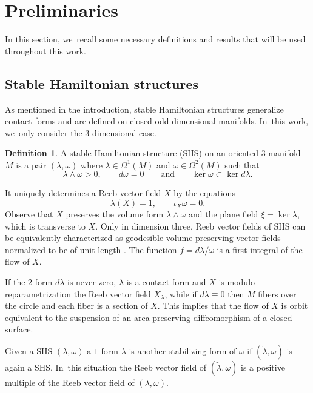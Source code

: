 \documentclass[JEP,XML,SOM,Unicode,NoEqCountersInSection,NoFloatCountersInSection,published]{cedram}
\newcommand{\threemanifold}{$3$\nobreakdash-mani\-fold\xspace}
\theoremstyle{definition}
\newtheorem{defi}[theorem]{Definition}
\begin{document}
\section{Preliminaries}\label{sec:prelim}

In this section, we~recall some necessary definitions and results that will be used throughout this work.

\subsection{Stable Hamiltonian structures}\label{ss:SHS}

As mentioned in the introduction, stable Hamiltonian structures generalize contact forms and are defined on closed odd-dimensional manifolds. In~this work, we~only consider the 3-dimensional case.

\begin{defi}
A stable Hamiltonian structure (SHS) on an oriented \threemanifold~$M$ is a pair $(\lambda,\omega)$ where $\lambda \in \Omega^1(M)$ and $\omega \in \Omega^2(M)$ such that
\[
\lambda\wedge \omega>0, \qquad d\omega=0 \qquad \mbox{and} \qquad \ker \omega \subset \ker d\lambda.
\]
\end{defi}

It uniquely determines a Reeb vector field $X$ by the equations
\[
\lambda(X)=1,\qquad \iota_X\omega=0.
\]
Observe that $X$ preserves the volume form $\lambda\wedge \omega$ and the plane field $\xi=\ker \lambda$, which is transverse to $X$. Only in dimension three, Reeb vector fields of SHS can be equivalently characterized as geodesible volume-preserving vector fields normalized to be of unit length \cite{Re}. The function $f=d\lambda/\omega$ is a first integral of the flow of $X$.

If the 2-form $d\lambda$ is never zero, $\lambda$ is a contact form and $X$ is modulo reparametrization the Reeb vector field $X_\lambda$, while if $d\lambda\equiv 0$ then $M$ fibers over the circle and each fiber is a section of $X$. This implies that the flow of $X$ is orbit equivalent to
the suspension of an area-preserving diffeomorphism of a closed surface.

Given a SHS $(\lambda,\omega)$ a $1$-form $\widetilde{\lambda}$ is another stabilizing form of $\omega$ if $(\widetilde{\lambda}, \omega)$ is again a SHS. In~this situation the Reeb vector field of $(\widetilde{\lambda},\omega)$ is a positive multiple of the Reeb vector field of $(\lambda,\omega)$.
\end{document}
